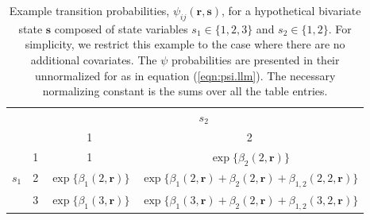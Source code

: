 \documentclass[fleqn]{article}
\newcommand{\bs}{\ensuremath{\mathbf{s}}}
\newcommand{\br}{\ensuremath{\mathbf{r}}}
\begin{document}
\clearpage

\begin{table}[ht]
\centering
\parbox{\textwidth}{\caption{\label{tb:psi.example}  Example transition probabilities, $\psi_{ij}(\br,\bs)$, for a hypothetical bivariate state $\bs$ composed of state variables $s_1\in\{1,2,3\}$ and $s_2\in\{1,2\}$. For simplicity, we restrict this example to the case where there are no additional covariates. The $\psi$ probabilities are presented in their unnormalized for as in equation (\ref{eqn:psi.llm}). The necessary normalizing constant is the sums over all the table entries.}} \medskip

\begin{tabular}{cc|cc|} \cline{3-4}
                           &  & \multicolumn{2}{c|}{$s_2$}\\ 
                           &  & 1 & 2 \\ \hline
\multicolumn{1}{|c}{}      & \multicolumn{1}{c|}{1} & 1 & $\exp\{\beta_2(2,\br)\}$ \\
\multicolumn{1}{|c}{$s_1$} & \multicolumn{1}{c|}{2} & $\exp\{\beta_1(2,\br)\}$ & $\exp\{\beta_1(2,\br)+\beta_2(2,\br)+\beta_{1,2}(2,2,\br)\}$ \\
\multicolumn{1}{|c}{}      &  \multicolumn{1}{c|}{3} & $\exp\{\beta_1(3,\br)\}$ & $\exp\{\beta_1(3,\br)+\beta_2(2,\br)+\beta_{1,2}(3,2,\br)\}$ \\ \hline
\end{tabular}
\end{table}


\clearpage
\end{document}
